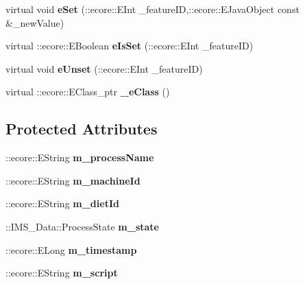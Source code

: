 \begin{DoxyCompactItemize}
\item 
\hypertarget{classIMS__Data_1_1Process_a57a52a5479c366ad216eec544b820482}{
virtual void {\bfseries eSet} (::ecore::EInt \_\-featureID,::ecore::EJavaObject const \&\_\-newValue)}
\label{classIMS__Data_1_1Process_a57a52a5479c366ad216eec544b820482}

\item 
\hypertarget{classIMS__Data_1_1Process_ac7f5e861a19f10984c64054df9269279}{
virtual ::ecore::EBoolean {\bfseries eIsSet} (::ecore::EInt \_\-featureID)}
\label{classIMS__Data_1_1Process_ac7f5e861a19f10984c64054df9269279}

\item 
\hypertarget{classIMS__Data_1_1Process_a994c0e741bb7228f74d63d20b66033a9}{
virtual void {\bfseries eUnset} (::ecore::EInt \_\-featureID)}
\label{classIMS__Data_1_1Process_a994c0e741bb7228f74d63d20b66033a9}

\item 
\hypertarget{classIMS__Data_1_1Process_a26234d1b3d9495dd47fd213baf795825}{
virtual ::ecore::EClass\_\-ptr {\bfseries \_\-eClass} ()}
\label{classIMS__Data_1_1Process_a26234d1b3d9495dd47fd213baf795825}

\end{DoxyCompactItemize}
\subsection*{Protected Attributes}
\begin{DoxyCompactItemize}
\item 
\hypertarget{classIMS__Data_1_1Process_a79cb630ed80a991f45db0c979acaa50a}{
::ecore::EString {\bfseries m\_\-processName}}
\label{classIMS__Data_1_1Process_a79cb630ed80a991f45db0c979acaa50a}

\item 
\hypertarget{classIMS__Data_1_1Process_a1531438dfa7b0905a24300b1e8bbfe2c}{
::ecore::EString {\bfseries m\_\-machineId}}
\label{classIMS__Data_1_1Process_a1531438dfa7b0905a24300b1e8bbfe2c}

\item 
\hypertarget{classIMS__Data_1_1Process_a76d5397afbe8330001c027d41252d3ee}{
::ecore::EString {\bfseries m\_\-dietId}}
\label{classIMS__Data_1_1Process_a76d5397afbe8330001c027d41252d3ee}

\item 
\hypertarget{classIMS__Data_1_1Process_ad38fb4f04c0fac5ffaaab83d7de6fc68}{
::IMS\_\-Data::ProcessState {\bfseries m\_\-state}}
\label{classIMS__Data_1_1Process_ad38fb4f04c0fac5ffaaab83d7de6fc68}

\item 
\hypertarget{classIMS__Data_1_1Process_a5857caca341f2b2e29551209f7182d78}{
::ecore::ELong {\bfseries m\_\-timestamp}}
\label{classIMS__Data_1_1Process_a5857caca341f2b2e29551209f7182d78}

\item 
\hypertarget{classIMS__Data_1_1Process_ac2833f5b078a952244ff8aa1bb4ecd39}{
::ecore::EString {\bfseries m\_\-script}}
\label{classIMS__Data_1_1Process_ac2833f5b078a952244ff8aa1bb4ecd39}

\end{DoxyCompactItemize}


